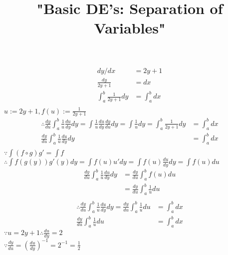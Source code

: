 \documentclass[10pt,a4paper,fleqn]{article}
\title{"Basic DE's: Separation of Variables"}
\date{}
\begin{document}
  \maketitle 
  \begin{align}
    dy/dx &= 2y + 1 \\
    \frac{dy}{2y+1} &= dx \\
    \int_a^b \frac{1}{2y+1}dy &= \int_a^b dx \\
  \end{align} 
    $u := 2y+1, f(u) := \frac{1}{2y+1}$
  \begin{align}
    \therefore \frac{dy}{du} \int_a^b \frac{1}{u} \frac{du}{dy} dy = \int \frac{1}{u} \frac{du}{dy} \frac{dy}{du}dy = \int \frac{1}{u}dy = \int_a^b \frac{1}{2y+1}dy &= \int_a^b dx \\
    \frac{dy}{du} \int_a^b \frac{1}{u} \frac{du}{dy} dy &= \int_a^b dx \\
  \end{align} 
$\because \int (f \circ g)g' = \int f$ \\
$\therefore \int f(g(y))g'(y)dy = \int f(u)u'dy = \int f(u) \frac{du}{dy}dy = \int f(u)du$ \\
  \begin{align} 
    \frac{dy}{du} \int_a^b \frac{1}{u} \frac{du}{dy} dy
                      &= \frac{dy}{du} \int_a^b f(u) du \\
                      &= \frac{dy}{du} \int_a^b \frac{1}{u} du \\
  \end{align}
%  
  \begin{align}
    \therefore \frac{dy}{du} \int_a^b \frac{1}{u} \frac{du}{dy} dy = \frac{dy}{du} \int_a^b \frac{1}{u} du &= \int_a^b dx \\
    \frac{dy}{du} \int_a^b \frac{1}{u} du &= \int_a^b dx
  \end{align}
$\because u = 2y+1 \therefore \frac{du}{dy} = 2$ \\
$\because \frac{dy}{du} = (\frac{du}{dy})^{-1} = 2^{-1} = \frac{1}{2}$ \\
\end{document}
